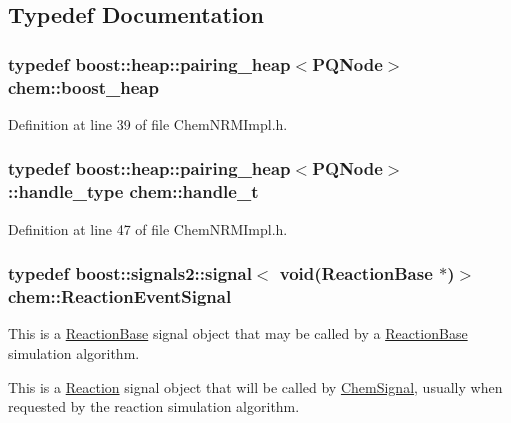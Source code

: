 \subsection{Typedef Documentation}
\hypertarget{namespacechem_aacd1d2bb93e0bb1b1af9bb1fbb5133ca}{
\subsubsection[{boost\-\_\-heap}]{\setlength{\rightskip}{0pt plus 5cm}typedef boost\-::heap\-::pairing\-\_\-heap$<${\bf P\-Q\-Node}$>$ {\bf chem\-::boost\-\_\-heap}}}\label{namespacechem_aacd1d2bb93e0bb1b1af9bb1fbb5133ca}


Definition at line 39 of file Chem\-N\-R\-M\-Impl.\-h.

\hypertarget{namespacechem_a33be80d87771bff54f5cede2e5d81cd1}{
\subsubsection[{handle\-\_\-t}]{\setlength{\rightskip}{0pt plus 5cm}typedef boost\-::heap\-::pairing\-\_\-heap$<${\bf P\-Q\-Node}$>$\-::handle\-\_\-type {\bf chem\-::handle\-\_\-t}}}\label{namespacechem_a33be80d87771bff54f5cede2e5d81cd1}


Definition at line 47 of file Chem\-N\-R\-M\-Impl.\-h.

\hypertarget{namespacechem_a40bfcc5c8ae87e2713c68fae68215991}{
\subsubsection[{Reaction\-Event\-Signal}]{\setlength{\rightskip}{0pt plus 5cm}typedef boost\-::signals2\-::signal$<$ void({\bf Reaction\-Base} $\ast$)$>$ {\bf chem\-::\-Reaction\-Event\-Signal}}}\label{namespacechem_a40bfcc5c8ae87e2713c68fae68215991}


This is a \hyperlink{classchem_1_1ReactionBase}{Reaction\-Base} signal object that may be called by a \hyperlink{classchem_1_1ReactionBase}{Reaction\-Base} simulation algorithm. 

This is a \hyperlink{classchem_1_1Reaction}{Reaction} signal object that will be called by \hyperlink{classchem_1_1ChemSignal}{Chem\-Signal}, usually when requested by the reaction simulation algorithm. 


